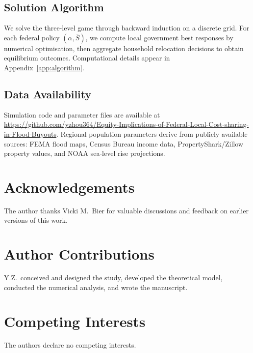 \documentclass[11pt,letterpaper]{article}
\theoremstyle{definition}
\begin{document}
\subsection{Solution Algorithm}

We solve the three-level game through backward induction on a discrete grid. For each federal policy $(\alpha, \bar{S})$, we compute local government best responses by numerical optimisation, then aggregate household relocation decisions to obtain equilibrium outcomes. Computational details appear in Appendix~\ref{app:algorithm}.

\subsection{Data Availability}

Simulation code and parameter files are available at \url{https://github.com/yzhou364/Equity-Implications-of-Federal-Local-Cost-sharing-in-Flood-Buyouts}. Regional population parameters derive from publicly available sources: FEMA flood maps, Census Bureau income data, PropertyShark/Zillow property values, and NOAA sea-level rise projections.


\section*{Acknowledgements}
The author thanks Vicki M.\ Bier for valuable discussions and feedback on earlier versions of this work.

\section*{Author Contributions}
Y.Z.\ conceived and designed the study, developed the theoretical model, conducted the numerical analysis, and wrote the manuscript.

\section*{Competing Interests}
The authors declare no competing interests.

\end{document}
